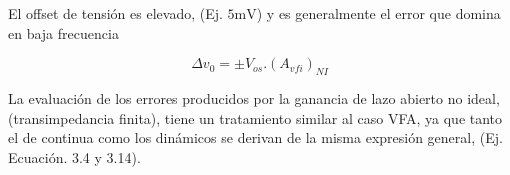 El offset de tensión es elevado, (Ej. $5\text{mV}$) y es generalmente el error que domina en baja frecuencia

\begin{equation}
\Delta v_0 = \pm V_{os} . (A_{vfi})_{NI}
\label{eq:3.17}
\end{equation}

La evaluación de los errores producidos por la ganancia de lazo abierto no ideal, (transimpedancia finita), tiene un tratamiento similar al caso VFA, ya que tanto el de continua como los dinámicos se derivan de la misma expresión general, (Ej. Ecuación. 3.4 y 3.14).